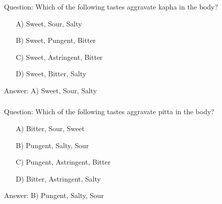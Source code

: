 \begin{frame}[fragile]\frametitle{}

Question: Which of the following tastes aggravate kapha in the body?

\begin{itemize}
\item[A)] Sweet, Sour, Salty
\item[B)] Sweet, Pungent, Bitter
\item[C)] Sweet, Astringent, Bitter
\item[D)] Sweet, Bitter, Salty
\end{itemize}

Answer: A) Sweet, Sour, Salty
\end{frame}

\begin{frame}[fragile]\frametitle{}

Question: Which of the following tastes aggravate pitta in the body?

\begin{itemize}
\item[A)] Bitter, Sour, Sweet
\item[B)] Pungent, Salty, Sour
\item[C)] Pungent, Astringent, Bitter
\item[D)] Bitter, Astringent, Salty
\end{itemize}

Answer: B) Pungent, Salty, Sour
\end{frame}
